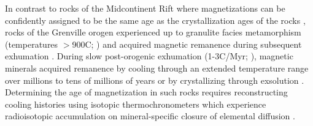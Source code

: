 In contrast to rocks of the Midcontinent Rift where magnetizations can be confidently assigned to be the same age as the crystallization ages of the rocks \cite[e.g.][]{Davis1997a,Fairchild2017a,Swanson-Hysell2019a}, rocks of the Grenville orogen experienced up to granulite facies metamorphism (temperatures $>$900\textdegree C; ) and acquired magnetic remanence during subsequent exhumation \citep{McWilliams1975a, Dunlop1985a, Dodson1985a}. During slow post-orogenic exhumation (1-3\textdegree C/Myr; ), magnetic minerals acquired remanence by cooling through an extended temperature range over millions to tens of millions of years \citep{Pullaiah1975a, Dodson1980a} or by crystallizing through exsolution \citep{McEnroe2007a}. Determining the age of magnetization in such rocks requires reconstructing cooling histories using isotopic thermochronometers which experience radioisotopic accumulation on mineral-specific closure of elemental diffusion \citep{Dodson1973a, Dodson1985a}. 

